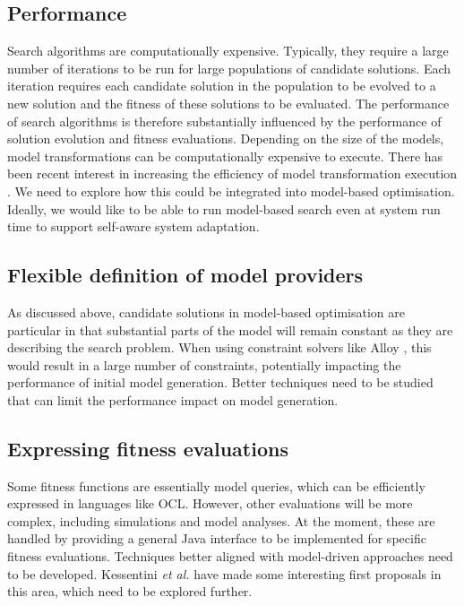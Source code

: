 	\subsection{Performance}
	
		Search algorithms are computationally expensive. Typically, they require a large number of iterations to be run for large populations of candidate solutions.
		Each iteration requires each candidate solution in the population to be evolved to a new solution and the fitness of these solutions to be evaluated. The
		performance of search algorithms is therefore substantially influenced by the performance of solution evolution and fitness evaluations. Depending on the size
		of the models, model transformations can be computationally expensive to execute. There has been recent interest in increasing the efficiency of model
		transformation execution \cite{Amstel+11,Meszaros2010}. We need to explore how this could be integrated into model-based optimisation. Ideally, we would like
		to be able to run model-based search even at system run time to support self-aware system adaptation.
		
	\subsection{Flexible definition of model providers}
	
		As discussed above, candidate solutions in model-based optimisation are particular in that substantial parts of the model will remain constant as they are
		describing the search problem. When using constraint solvers like Alloy \cite{Jackson02}, this would result in a large number of constraints, potentially
		impacting the performance of initial model generation. Better techniques need to be studied that can limit the performance impact on model generation.
		
	\subsection{Expressing fitness evaluations}
	
		Some fitness functions are essentially model queries, which can be efficiently expressed in languages like OCL. However, other evaluations will be more
		complex, including simulations and model analyses. At the moment, these are handled by providing a general Java interface to be implemented for specific
		fitness evaluations. Techniques better aligned with model-driven approaches need to be developed. Kessentini \emph{et al.} \cite{Kessentini+13} have made some
		interesting first proposals in this area, which need to be explored further.